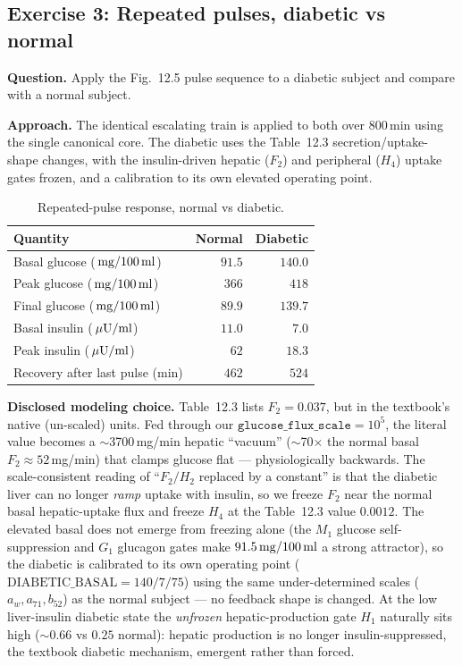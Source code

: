 \subsection{Exercise 3: Repeated pulses, diabetic vs normal}

\textbf{Question.} Apply the Fig.~12.5 pulse sequence to a diabetic subject and compare with a normal
subject.

\textbf{Approach.} The identical escalating train is applied to both over 800\,min using the single
canonical core. The diabetic uses the Table~12.3 secretion/uptake-shape changes, with the
insulin-driven hepatic ($F_2$) and peripheral ($H_4$) uptake gates frozen, and a calibration to its
own elevated operating point.

\begin{table}[H]
\centering
\caption{Repeated-pulse response, normal vs diabetic.}
\label{tab:ex3}
\begin{tabular}{lrr}
\toprule
Quantity & Normal & Diabetic \\
\midrule
Basal glucose ($\,\mathrm{mg}/100\,\mathrm{ml}$) & $91.5$ & $140.0$ \\
Peak glucose ($\,\mathrm{mg}/100\,\mathrm{ml}$) & $366$ & $418$ \\
Final glucose ($\,\mathrm{mg}/100\,\mathrm{ml}$) & $89.9$ & $139.7$ \\
Basal insulin ($\,\mu\mathrm{U}/\mathrm{ml}$) & $11.0$ & $7.0$ \\
Peak insulin ($\,\mu\mathrm{U}/\mathrm{ml}$) & $62$ & $18.3$ \\
Recovery after last pulse (min) & $462$ & $524$ \\
\bottomrule
\end{tabular}
\end{table}

\textbf{Disclosed modeling choice.} Table~12.3 lists $F_2=0.037$, but in the textbook's native
(un-scaled) units. Fed through our $\texttt{glucose\_flux\_scale}=10^{5}$, the literal value becomes a
$\sim$3700\,mg/min hepatic ``vacuum'' ($\sim$70$\times$ the normal basal $F_2\approx52$\,mg/min) that
clamps glucose flat --- physiologically backwards. The scale-consistent reading of ``$F_2/H_2$ replaced
by a constant'' is that the diabetic liver can no longer \emph{ramp} uptake with insulin, so we freeze
$F_2$ near the normal basal hepatic-uptake flux and freeze $H_4$ at the Table~12.3 value $0.0012$. The
elevated basal does not emerge from freezing alone (the $M_1$ glucose self-suppression and $G_1$
glucagon gates make $91.5\,\mathrm{mg}/100\,\mathrm{ml}$ a strong attractor), so the diabetic is calibrated to its own operating
point ($\mathrm{DIABETIC\_BASAL}=140/7/75$) using the same under-determined scales ($a_w,a_{71},b_{52}$)
as the normal subject --- no feedback shape is changed. At the low liver-insulin diabetic state the
\emph{unfrozen} hepatic-production gate $H_1$ naturally sits high ($\sim$0.66 vs $0.25$ normal):
hepatic production is no longer insulin-suppressed, the textbook diabetic mechanism, emergent rather
than forced.

